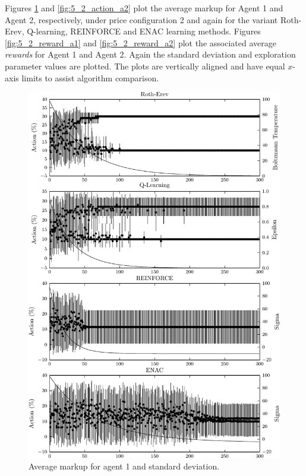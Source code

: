 Figures \ref{fig:5_2_action_a1} and \ref{fig:5_2_action_a2} plot the average
markup for Agent 1 and Agent 2, respectively, under price
configuration 2 and again for the variant Roth-Erev, Q-learning, REINFORCE and
ENAC learning methods.  Figures \ref{fig:5_2_reward_a1} and
\ref{fig:5_2_reward_a2} plot the associated average \textit{rewards} for
Agent 1 and Agent 2.  Again the standard deviation and exploration parameter
values are plotted. The plots are vertically aligned and have equal $x$-axis
limits to assist algorithm comparison.
\begin{figure}
  \centering
  \includegraphics{figures/fig5_2_action_a1}
  \caption{Average markup for agent 1 and standard deviation.}
  \label{fig:5_2_action_a1}
\end{figure}
